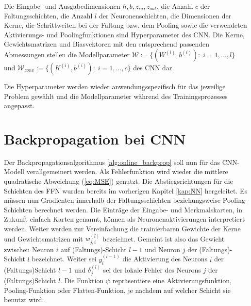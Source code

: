 \begin{defi}
    Die Eingabe- und Ausgabedimensionen $h, b, z_{in}, z_{out}$, die Anzahl $c$ der Faltungsschichten, die Anzahl $l$ der Neuronenschichten, die Dimensionen der Kerne, die Schrittweiten bei der Faltung bzw. dem Pooling sowie die verwendeten Aktivierungs- und Poolingfunktionen sind Hyperparameter des CNN.
    Die Kerne, Gewichtsmatrizen und Biasvektoren mit den entsprechend passenden Abmessungen stellen die Modellparameter $\mathcal{W}:=\{(W^{(i)},b^{(i)}): \; i=1, \ldots, l\}$ und $\mathcal{W}_{conv}:=\{(K^{(i)}, b^{(i)}): \; i=1, \ldots, c\}$ des CNN dar. 
\end{defi}
Die Hyperparameter werden wieder anwendungsspezifisch für das jeweilige Problem gewählt und die Modellparameter während des Trainingsprozesses angepasst. 


\section{Backpropagation bei CNN}
\label{abs:CNN_train}
Der Backpropagationsalgorithmus \ref{alg:online_backprop} soll nun für das CNN-Modell verallgemeinert werden. 
Als Fehlerfunktion wird wieder die mittlere quadratische Abweichung (\ref{eq:MSE})
genutzt. 
Die Abstiegsrichtungen für die Schichten des FFN wurden bereits im vorherigen Kapitel \ref{kap:NN} hergeleitet. Es müssen nun Gradienten innerhalb der Faltungsschichten beziehungsweise Pooling-Schichten berechnet werden. Die Einträge der Eingabe- und Merkmalskarten, in Zukunft einfach Karten genannt, können als Neuronenaktivierungen interpretiert werden. Weiter werden zur Vereinfachung die trainierbaren Gewichte der Kerne und Gewichtsmatrizen mit $w_{j,i}^{(l)}$ bezeichnet. Gemeint ist also das Gewicht zwischen Neuron $i$ auf (Faltungs)-Schicht $l-1$ und Neuron $j$ der (Faltungs)-Schicht $l$ bezeichnet. Weiter sei $y_{i}^{(l-1)}$ die Aktivierung des Neurons $i$ der (Faltungs)Schicht $l-1$ und $\delta_j^{(l)}$ sei der lokale Fehler des Neurons $j$ der (Faltungs)Schicht $l$. Die Funktion $\psi$ repräsentiere eine Aktivierungsfunktion, Pooling-Funktion oder Flatten-Funktion, je nachdem auf welcher Schicht sie benutzt wird.


